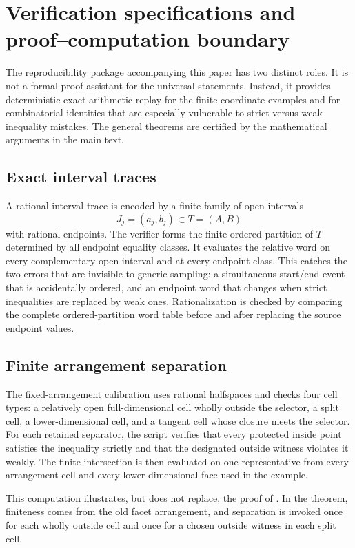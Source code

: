 \section{Verification specifications and proof--computation boundary}
\label{app:verification}

The reproducibility package accompanying this paper has two distinct roles.  It is not a formal proof assistant for the universal statements.  Instead, it provides deterministic exact-arithmetic replay for the finite coordinate examples and for combinatorial identities that are especially vulnerable to strict-versus-weak inequality mistakes.  The general theorems are certified by the mathematical arguments in the main text.

\subsection{Exact interval traces}

A rational interval trace is encoded by a finite family of open intervals
\[
 J_j=(a_j,b_j)\subset T=(A,B)
\]
with rational endpoints.  The verifier forms the finite ordered partition of $T$ determined by all endpoint equality classes.  It evaluates the relative word on every complementary open interval and at every endpoint class.  This catches the two errors that are invisible to generic sampling: a simultaneous start/end event that is accidentally ordered, and an endpoint word that changes when strict inequalities are replaced by weak ones.  Rationalization is checked by comparing the complete ordered-partition word table before and after replacing the source endpoint values.

\subsection{Finite arrangement separation}

The fixed-arrangement calibration uses rational halfspaces and checks four cell types: a relatively open full-dimensional cell wholly outside the selector, a split cell, a lower-dimensional cell, and a tangent cell whose closure meets the selector.  For each retained separator, the script verifies that every protected inside point satisfies the inequality strictly and that the designated outside witness violates it weakly.  The finite intersection is then evaluated on one representative from every arrangement cell and every lower-dimensional face used in the example.

This computation illustrates, but does not replace, the proof of .  In the theorem, finiteness comes from the old facet arrangement, and separation is invoked once for each wholly outside cell and once for a chosen outside witness in each split cell.

